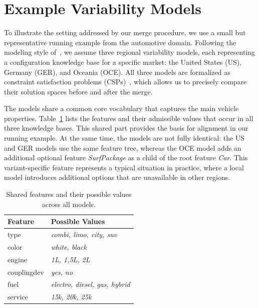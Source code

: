 \documentclass{ceurart}
\begin{document}
\section{Example Variability Models}
To illustrate the setting addressed by our merge procedure, we use a
small but representative running example from the automotive domain.
Following the modeling style of~\cite{Uta2019}, we assume three
regional variability models, each representing a configuration
knowledge base for a specific market: the United States (US), Germany
(GER), and Oceania (OCE).  All three models are formalized as
constraint satisfaction problems (CSPs)~\cite{Tsang1993}, which allows
us to precisely compare their solution spaces before and after the
merge.

The models share a common core vocabulary that captures the main
vehicle properties.  Table~\ref{tab:features} lists the features and
their admissible values that occur in all three knowledge bases.
This shared part provides the basis for alignment in our running
example.  At the same time, the models are not fully identical:
the US and GER models use the same feature tree, whereas the OCE model
adds an additional optional feature \textit{SurfPackage} as a child of
the root feature \textit{Car}.  This variant-specific feature
represents a typical situation in practice, where a local model
introduces additional options that are unavailable in other regions.

\begin{table}[h]
\caption{Shared features and their possible values across all models.}
\label{tab:features}
\centering
\begin{tabular}{ll}
\toprule
\textbf{Feature} & \textbf{Possible Values} \\
\midrule
type         & \textit{combi, limo, city, suv} \\
color        & \textit{white, black} \\
engine       & \textit{1L, 1{,}5L, 2L} \\
couplingdev  & \textit{yes, no} \\
fuel         & \textit{electro, diesel, gas, hybrid} \\
service      & \textit{15k, 20k, 25k} \\
\bottomrule
\end{tabular}
\end{table}
\end{document}
